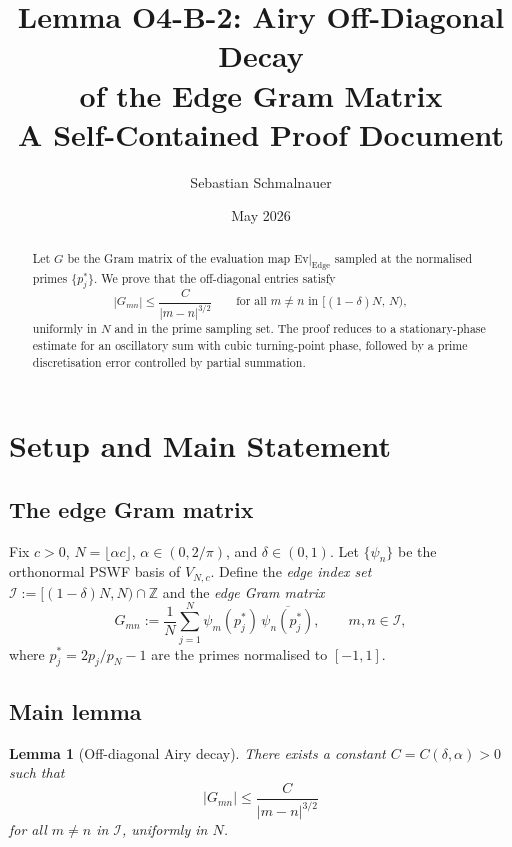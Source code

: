 \documentclass[12pt,a4paper]{amsart}
\title{Lemma O4-B-2: Airy Off-Diagonal Decay\\
of the Edge Gram Matrix\\
{\normalsize A Self-Contained Proof Document}}
\author{Sebastian Schmalnauer}
\date{May 2026}
\newtheorem{lemma}[theorem]{Lemma}
\theoremstyle{definition}
\newcommand{\Edge}{\mathrm{Edge}}
\begin{document}
\maketitle

\begin{abstract}
Let $G$ be the Gram matrix of the evaluation map $\mathrm{Ev}|_{\Edge}$
sampled at the normalised primes $\{p_j^*\}$.
We prove that the off-diagonal entries satisfy
\[
  |G_{mn}| \le \frac{C}{|m-n|^{3/2}}
  \qquad \text{for all } m \ne n \text{ in } [(1-\delta)N,\, N),
\]
uniformly in $N$ and in the prime sampling set.
The proof reduces to a stationary-phase estimate for an
oscillatory sum with cubic turning-point phase,
followed by a prime discretisation error controlled by
partial summation.
\end{abstract}

\tableofcontents

\section{Setup and Main Statement}
\label{sec:setup}

\subsection{The edge Gram matrix}

Fix $c > 0$, $N = \lfloor \alpha c \rfloor$, $\alpha \in (0,2/\pi)$,
and $\delta \in (0,1)$.
Let $\{\psi_n\}$ be the orthonormal PSWF basis of $V_{N,c}$.
Define the \emph{edge index set}
$\mathcal{I} := [(1-\delta)N, N) \cap \mathbb{Z}$
and the \emph{edge Gram matrix}
\[
  G_{mn} := \frac{1}{N}\sum_{j=1}^{N} \psi_m(p_j^*)\,\overline{\psi_n(p_j^*)},
  \qquad m,n \in \mathcal{I},
\]
where $p_j^* = 2p_j/p_N - 1$ are the primes normalised to $[-1,1]$.

\subsection{Main lemma}

\begin{lemma}[Off-diagonal Airy decay]\label{lem:offdiag}
There exists a constant $C = C(\delta, \alpha) > 0$ such that
\[
  |G_{mn}| \le \frac{C}{|m-n|^{3/2}}
\]
for all $m \ne n$ in $\mathcal{I}$, uniformly in $N$.
\end{lemma}
\end{document}

